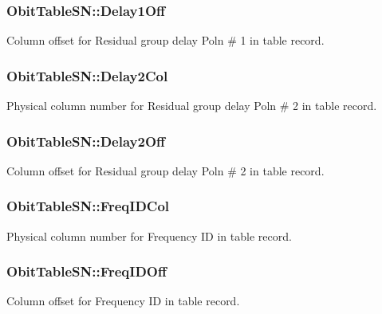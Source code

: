 \subsubsection{ {\bf Obit\-Table\-SN::Delay1Off}}\label{structObitTableSN_o44}


Column offset for Residual group delay Poln \# 1 in table record. 

\subsubsection{ {\bf Obit\-Table\-SN::Delay2Col}}\label{structObitTableSN_o59}


Physical column number for Residual group delay Poln \# 2 in table record. 

\subsubsection{ {\bf Obit\-Table\-SN::Delay2Off}}\label{structObitTableSN_o58}


Column offset for Residual group delay Poln \# 2 in table record. 

\subsubsection{ {\bf Obit\-Table\-SN::Freq\-IDCol}}\label{structObitTableSN_o33}


Physical column number for Frequency ID in table record. 

\subsubsection{ {\bf Obit\-Table\-SN::Freq\-IDOff}}\label{structObitTableSN_o32}


Column offset for Frequency ID in table record. 

